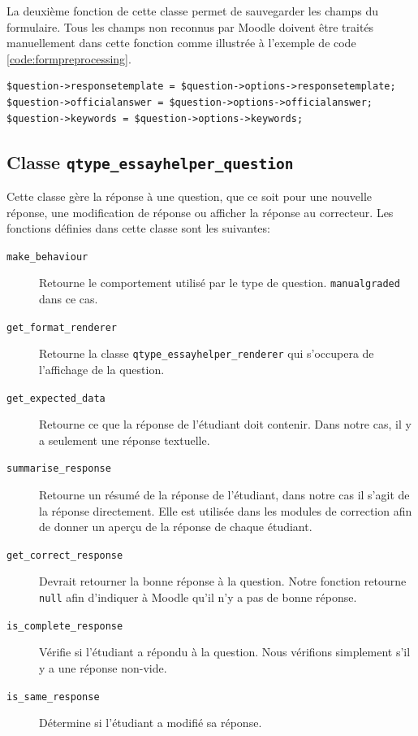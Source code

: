 La deuxi\`eme fonction de cette classe permet de sauvegarder les champs du formulaire.
Tous les champs non reconnus par Moodle doivent \^etre trait\'es manuellement dans cette fonction comme illustr\'ee \`a l'exemple de code \ref{code:formpreprocessing}.
\begin{lstfloat}
\begin{lstlisting}[frame=l]
$question->responsetemplate = $question->options->responsetemplate;
$question->officialanswer = $question->options->officialanswer;
$question->keywords = $question->options->keywords;
\end{lstlisting}
\caption{Extrait du code de la fonction \texttt{data\_preprocessing} de la classe \texttt{qtype\_essayhelper\_edit\_form}.}
\label{code:formpreprocessing}
\end{lstfloat}
\subsection*{Classe \texttt{qtype\_essayhelper\_question}}
Cette classe g\`ere la r\'eponse \`a une question, que ce soit pour une nouvelle r\'eponse, une modification de r\'eponse ou afficher la r\'eponse au correcteur.
Les fonctions d\'efinies dans cette classe sont les suivantes:
\begin{description}
  \item[\texttt{make\_behaviour}] Retourne le comportement utilis\'e par le type de question. \texttt{manualgraded} dans ce cas.
  \item[\texttt{get\_format\_renderer}] Retourne la classe \texttt{qtype\_essayhelper\_renderer} qui s'occupera de l'affichage de la question.
  \item[\texttt{get\_expected\_data}] Retourne ce que la r\'eponse de l'\'etudiant doit contenir. Dans notre cas, il y a seulement une r\'eponse textuelle.
  \item[\texttt{summarise\_response}] Retourne un r\'esum\'e de la r\'eponse de l'\'etudiant, dans notre cas il s'agit de la r\'eponse directement. Elle est utilis\'ee dans les modules de correction afin de donner un aper\c{c}u de la r\'eponse de chaque \'etudiant.
  \item[\texttt{get\_correct\_response}] Devrait retourner la bonne r\'eponse \`a la question. Notre fonction retourne \texttt{null} afin d'indiquer \`a Moodle qu'il n'y a pas de bonne r\'eponse.
  \item[\texttt{is\_complete\_response}] V\'erifie si l'\'etudiant a r\'epondu \`a la question. Nous v\'erifions simplement s'il y a une r\'eponse non-vide.
  \item[\texttt{is\_same\_response}] D\'etermine si l'\'etudiant a modifi\'e sa r\'eponse.
\end{description}
